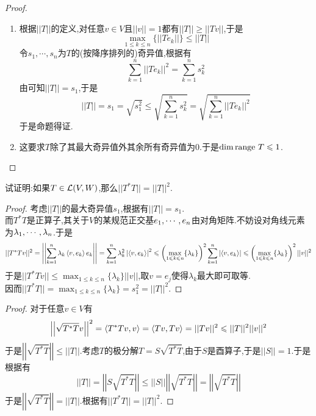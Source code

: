 \documentclass{ctexart}
\begin{document}
\begin{proof}
    \begin{enumerate}[label=\tbf{(\arabic*)}]
        \item 根据$||T||$的定义,对任意$v\in V$且$||v||=1$都有$||T||\geqslant||Tv||$,于是
            \[\max_{1\leqslant k\leqslant n}\{||Te_k||\}\leqslant||T||\]
            令$s_1,\cdots,s_n$为$T$的(按降序排列的)奇异值,根据有
            \[\sum_{k=1}^{n}||Te_k||^2=\sum_{k=1}^{n}s_k^2\]
            由可知$||T||=s_1$,于是
            \[||T||=s_1=\sqrt{s_1^2}\leqslant\sqrt{\sum_{k=1}^{n}s_k^2}=\sqrt{\sum_{k=1}^{n}||Te_k||^2}\]
            于是命题得证.
        \item 这要求$T$除了其最大奇异值外其余所有奇异值为$0$.于是$\dim\text{range } T\leqslant1$.
    \end{enumerate}
\end{proof}
\begin{problem}[19.]
    试证明:如果$T\in\mathcal{L}(V,W)$,那么$||T^*T||=||T||^2$.
\end{problem}
\begin{proof}
    考虑$||T||$的最大奇异值$s_1$,根据有$||T||=s_1$.\\
    而$T^*T$是正算子,其关于$V$的某规范正交基${e}_1,\cdots,{e}_{n}$由对角矩阵.不妨设对角线元素为${\lambda}_1,\cdots,{\lambda}_{n}$.于是
    \[||T^*Tv||^2=\left|\left|\sum_{k=1}^{n}\lambda_k\left\langle{v},{e_k}\right\rangle e_k\right|\right|
    =\sum_{k=1}^{n}\lambda_k^2\left|\left\langle{v},{e_k}\right\rangle\right|^2
    \leqslant\left(\max_{1\leqslant k\leqslant n}\{\lambda_k\}\right)^2\sum_{k=1}^{n}\left|\left\langle{v},{e_k}\right\rangle\right|
    \leqslant\left(\max_{1\leqslant k\leqslant n}\{\lambda_k\}\right)^2||v||^2\]
    于是$||T^*Tv||\leqslant\max_{1\leqslant k\leqslant n}\{\lambda_k\}||v||$,取$v=e_j$使得$\lambda_k$最大即可取等.\\
    因而$\displaystyle||T^*T||=\max_{1\leqslant k\leqslant n}\{\lambda_k\}=s_1^2=||T||^2$.
\end{proof}
\begin{proof}
    对于任意$v\in V$有
    \[\left|\left|\sqrt{T^*T}v\right|\right|^2=\left\langle{T^*Tv},{v}\right\rangle=\left\langle{Tv},{Tv}\right\rangle=||Tv||^2\leqslant||T||^2||v||^2\]
    于是$\left|\left|\sqrt{T^*T}\right|\right|\leqslant||T||$.考虑$T$的极分解$T=S\sqrt{T^*T}$,由于$S$是酉算子,于是$||S||=1$.于是根据有
    \[||T||=\left|\left|S\sqrt{T^*T}\right|\right|\leqslant||S||\left|\left|\sqrt{T^*T}\right|\right|=\left|\left|\sqrt{T^*T}\right|\right|\]
    于是$\left|\left|\sqrt{T^*T}\right|\right|=||T||$.根据有$||T^*T||=||T||^2$.
\end{proof}
\end{document}
